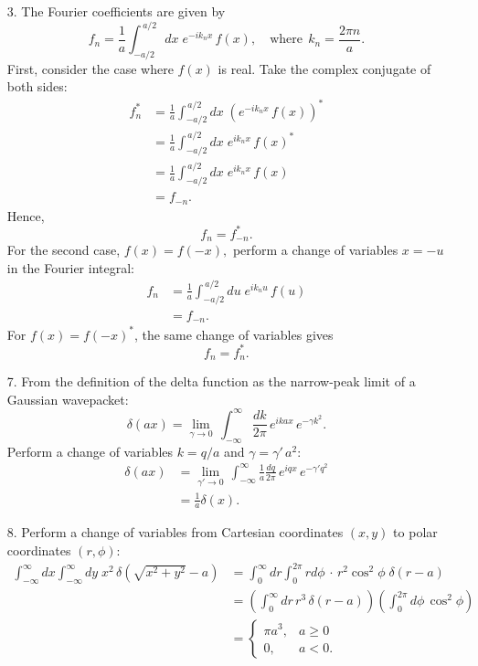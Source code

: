 \documentclass[10pt,a4paper]{article}
\begin{document}
\begin{enumerate}
\item[3.]
The Fourier coefficients are given by
\begin{equation}
  f_n = \frac{1}{a} \int_{-a/2}^{\,a/2} dx\; e^{-i k_n x}\, f(x), \quad \mathrm{where}\;\, k_n = \frac{2\pi n}{a}.
\end{equation}
First, consider the case where $f(x)$ is real. Take the complex
conjugate of both sides:
\begin{align}
  f_n^* &= \frac{1}{a} \int_{-a/2}^{\,a/2} dx\; \left(e^{-i k_n x}\, f(x)\right)^* \\
  &= \frac{1}{a} \int_{-a/2}^{\,a/2} dx\; e^{i k_n x}\, f(x)^* \\
  &= \frac{1}{a} \int_{-a/2}^{\,a/2} dx\; e^{i k_n x}\, f(x) \\
  &= f_{-n}.
\end{align}
Hence,
\begin{equation}
  f_{n} = f_{-n}^*.
\end{equation}
For the second case, $f(x) = f(-x),$ perform a change of variables $x
= -u$ in the Fourier integral:
\begin{align}
  f_n &= \frac{1}{a} \int_{-a/2}^{\,a/2} du\; e^{i k_n u}\, f(u) \\
  &= f_{-n}.
\end{align}
For $f(x) = f(-x)^*$, the same change of variables gives
\begin{equation}
  f_n = f_n^*.
\end{equation}

\item[7.]
From the definition of the delta function as the narrow-peak limit of a
Gaussian wavepacket:
\begin{equation}
  \delta(ax) = \lim_{\gamma \rightarrow 0} \, \int_{-\infty}^\infty \frac{dk}{2\pi} \, e^{ikax} \, e^{-\gamma k^2}.
\end{equation}
Perform a change of variables $k = q/a$ and $\gamma = \gamma' \, a^2$:
\begin{align}
  \delta(ax) &= \lim_{\gamma' \rightarrow 0} \, \int_{-\infty}^\infty \frac{1}{a}\frac{dq}{2\pi} \, e^{iqx} \, e^{-\gamma' q^2} \\
  &= \frac{1}{a} \delta(x).
\end{align}

\item[8.]
Perform a change of variables from Cartesian coordinates $(x,y)$ to
polar coordinates $(r,\phi)$:
\begin{align}
   \int_{-\infty}^\infty dx \int_{-\infty}^\infty dy \; x^2\, \delta\left(\sqrt{x^2+y^2}-a\right) &= \int_0^{\infty} dr \int_{0}^{2\pi} rd\phi\, \cdot\, r^2\cos^2\phi\; \delta(r-a) \\
  &= \left(\int_0^{\infty} dr \, r^3\, \delta(r-a)\right) \left(\int_{0}^{2\pi}\!d\phi \, \cos^2\phi\right) \\
  &= \begin{cases}\pi a^3, & a \ge 0 \\ 0, & a < 0.\end{cases} 
\end{align}
\end{enumerate}
\end{document}
